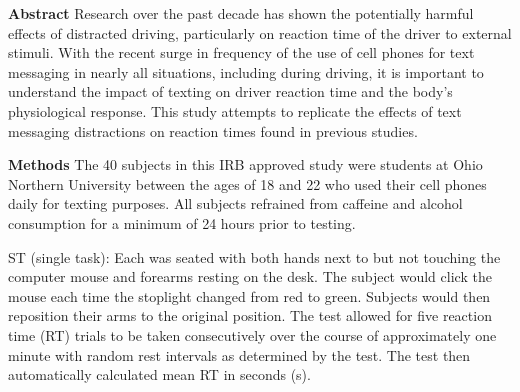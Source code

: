 \begin{alist}
  \begin{list}{}{}
  \item [\bf Abstract]
    Research over the past decade has shown the potentially harmful
    effects of distracted driving, particularly on reaction time of
    the driver to external stimuli. With the recent surge in frequency
    of the use of cell phones for text messaging in nearly all
    situations, including during driving, it is important to
    understand the impact of texting on driver reaction time and the
    body’s physiological response. This study attempts to replicate
    the effects of text messaging distractions on reaction times found
    in previous studies.
  \item [\bf Methods]
    The 40 subjects in this IRB approved study were students at Ohio
    Northern University between the ages of 18 and 22 who used their
    cell phones daily for texting purposes. All subjects refrained
    from caffeine and alcohol consumption for a minimum of 24 hours
    prior to testing.

    ST (single task): Each was seated with both hands next to but not
    touching the 
    computer mouse and forearms resting on the desk. The subject would
    click the mouse each time the stoplight changed from red to
    green. Subjects would then reposition their arms to the original
    position. The test allowed for five reaction time (RT) trials to be taken
    consecutively over the course of approximately one minute with
    random rest intervals as determined by the test.  The test then
    automatically calculated mean RT in seconds (s).


\end{list}
\end{alist}
